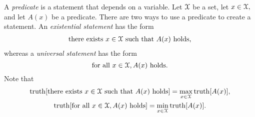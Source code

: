 













A {\it predicate} is a statement that depends on a variable.  Let ${\mathcal X}$ be a set, let $x\in{\mathcal X},$ and let $A(x)$ be a predicate.
%
%
%
%
There are two ways to use a predicate to create a statement.   An {\it existential statement}
%
has the form
\begin{align}\mbox{there exists}\  x\in {\mathcal X} \mbox{ such that } A(x) \mbox{ holds,} \label{0.1}
\end{align} whereas a {\it universal statement}
%
has the form
\begin{equation}\mbox{for all } x\in {\mathcal X},  A(x) \mbox{ holds.}\label{0.2X}
\end{equation}
%
%
%
Note that   %
%
\begin{gather}
%
%
\truth[\mbox{there exists }x\in\SX \mbox{ such that } A(x) \mbox{ holds}] = \max_{x\in\SX} \truth[A(x)],\\
%
\truth[\mbox{for all }x\in\SX, A(x)\mbox{ holds}] = \min_{x\in\SX} \truth[A(x)].       %
%
%
%
%
\end{gather}
%




